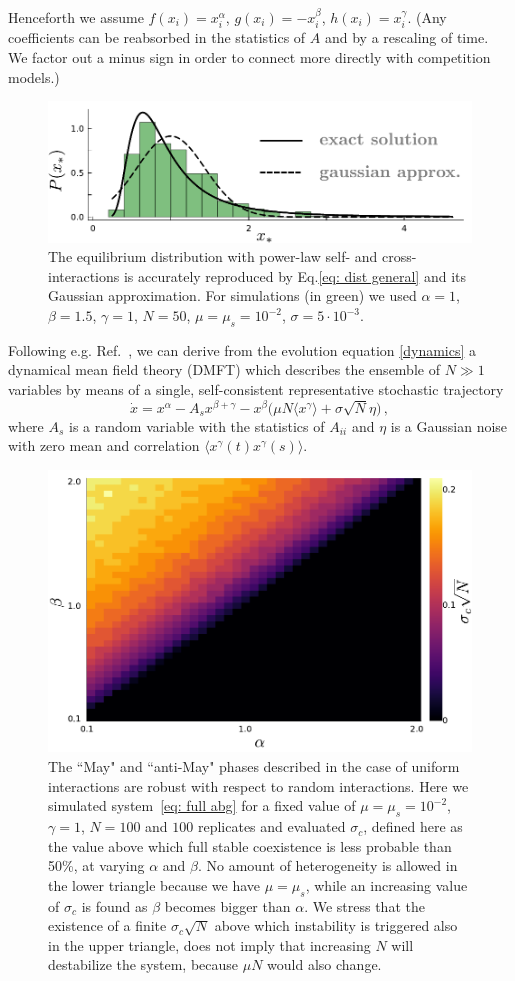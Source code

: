 Henceforth we assume $f(x_i)=x_i^{\alpha}$, $g(x_i)=-x_i^{\beta}$, $h(x_i)=x_i^{\gamma}$. 
(Any coefficients can be reabsorbed in the statistics of $A$ and by a rescaling of time. 
We factor out a minus sign in order to connect more directly with competition models.)


\begin{figure}[t!]
    \includegraphics[width=.45\textwidth]{figs/cavity.pdf}
    \caption{The equilibrium distribution with power-law self- and cross-interactions is accurately reproduced by 
    Eq.\eqref{eq: dist general} and its Gaussian approximation.
    For simulations (in green) we used $\alpha=1$, $\beta=1.5$,
    $\gamma=1$, $N=50$, $\mu=\mu_s=10^{-2}$, $\sigma=5\cdot 10^{-3}$.}
    \label{fig: cavity sol.}
\end{figure}


Following e.g. Ref.~\cite{Roy2019}, we can derive from the evolution equation \eqref{dynamics} a dynamical mean field theory (DMFT) 
which describes the ensemble of $N\gg 1$ variables
by means of a single, self-consistent representative stochastic trajectory
\begin{equation}
    \dot{x} = x^{\alpha}-A_sx^{\beta+\gamma}-x^{\beta}\big( \mu N \langle x^{\gamma}\rangle + \sigma \sqrt{N} \eta\big) \, ,
\label{eq: dmft}
\end{equation}
where $A_s$ is a random variable with the statistics of $A_{ii}$ and $\eta$ is a Gaussian noise with zero mean and correlation $\langle x^{\gamma}(t)x^{\gamma}(s)\rangle$. 


\begin{figure}[t!]
    \includegraphics[width=.45\textwidth]{figs/alpha-beta.pdf}
    \caption{The ``May" and ``anti-May" phases described in the
    case of uniform interactions are robust with respect to random interactions.
    Here we simulated system~\eqref{eq: full abg} for a fixed value of
    $\mu=\mu_s=10^{-2}$, $\gamma=1$, $N=100$ and $100$ replicates 
    and evaluated $\sigma_c$, defined here as
    the value above which full stable coexistence is less probable than 50\%,
    at varying $\alpha$ and $\beta$.
    No amount of heterogeneity is allowed in the lower triangle because we have $\mu=\mu_s$, while an increasing value of $\sigma_c$
    is found as $\beta$ becomes bigger than $\alpha$.
    We stress that the existence of a finite $\sigma_c\sqrt{N}$ above which instability is triggered also in the upper triangle,
    does not imply that increasing $N$ will destabilize the system, because $\mu N$ would also change.
    }
    \label{fig: alpha-beta}
\end{figure}
    

